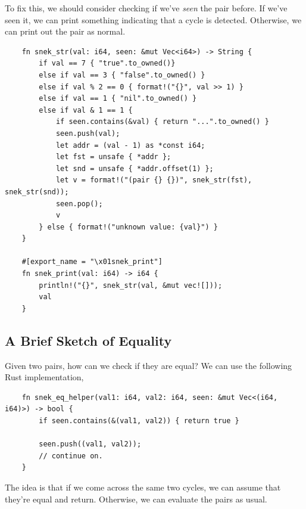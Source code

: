 \bigskip 

To fix this, we should consider checking if we've \emph{seen} the pair before. If we've seen it, we can print something indicating that a cycle is detected. Otherwise, we can print out the pair as normal. 
\begin{verbatim}
    fn snek_str(val: i64, seen: &mut Vec<i64>) -> String {
        if val == 7 { "true".to_owned()} 
        else if val == 3 { "false".to_owned() } 
        else if val % 2 == 0 { format!("{}", val >> 1) } 
        else if val == 1 { "nil".to_owned() } 
        else if val & 1 == 1 {
            if seen.contains(&val) { return "...".to_owned() }
            seen.push(val);
            let addr = (val - 1) as *const i64; 
            let fst = unsafe { *addr };
            let snd = unsafe { *addr.offset(1) };
            let v = format!("(pair {} {})", snek_str(fst), snek_str(snd));
            seen.pop();
            v 
        } else { format!("unknown value: {val}") }
    }

    #[export_name = "\x01snek_print"]
    fn snek_print(val: i64) -> i64 {
        println!("{}", snek_str(val, &mut vec![]));
        val 
    }\end{verbatim}

\subsection{A Brief Sketch of Equality}
Given two pairs, how can we check if they are equal? We can use the following Rust implementation, 
\begin{verbatim}
    fn snek_eq_helper(val1: i64, val2: i64, seen: &mut Vec<(i64, i64)>) -> bool {
        if seen.contains(&(val1, val2)) { return true }

        seen.push((val1, val2));
        // continue on.
    }\end{verbatim}
The idea is that if we come across the same two cycles, we can assume that they're equal and return. Otherwise, we can evaluate the pairs as usual.